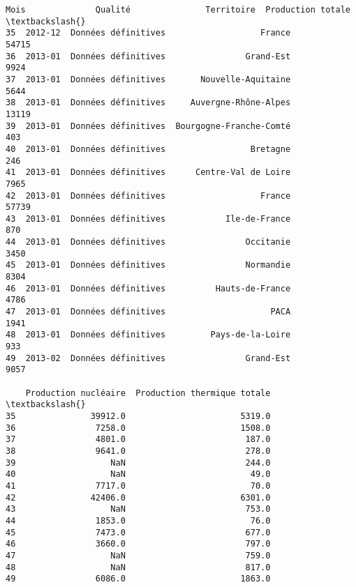 \documentclass[11pt]{article}
\makeatletter
\newcommand{\boxspacing}{\kern\kvtcb@left@rule\kern\kvtcb@boxsep}
\newcommand{\prompt}[4]{
        {\ttfamily\llap{{\color{#2}[#3]:\hspace{3pt}#4}}\vspace{-\baselineskip}}
    }
\makeatother
\begin{document}
            \begin{tcolorbox}[breakable, size=fbox, boxrule=.5pt, pad at break*=1mm, opacityfill=0]
\prompt{Out}{outcolor}{2}{\boxspacing}
\begin{Verbatim}[commandchars=\\\{\}]
       Mois              Qualité               Territoire  Production totale  \textbackslash{}
35  2012-12  Données définitives                   France              54715
36  2013-01  Données définitives                Grand-Est               9924
37  2013-01  Données définitives       Nouvelle-Aquitaine               5644
38  2013-01  Données définitives     Auvergne-Rhône-Alpes              13119
39  2013-01  Données définitives  Bourgogne-Franche-Comté                403
40  2013-01  Données définitives                 Bretagne                246
41  2013-01  Données définitives      Centre-Val de Loire               7965
42  2013-01  Données définitives                   France              57739
43  2013-01  Données définitives            Ile-de-France                870
44  2013-01  Données définitives                Occitanie               3450
45  2013-01  Données définitives                Normandie               8304
46  2013-01  Données définitives          Hauts-de-France               4786
47  2013-01  Données définitives                     PACA               1941
48  2013-01  Données définitives         Pays-de-la-Loire                933
49  2013-02  Données définitives                Grand-Est               9057

    Production nucléaire  Production thermique totale  \textbackslash{}
35               39912.0                       5319.0
36                7258.0                       1508.0
37                4801.0                        187.0
38                9641.0                        278.0
39                   NaN                        244.0
40                   NaN                         49.0
41                7717.0                         70.0
42               42406.0                       6301.0
43                   NaN                        753.0
44                1853.0                         76.0
45                7473.0                        677.0
46                3660.0                        797.0
47                   NaN                        759.0
48                   NaN                        817.0
49                6086.0                       1863.0


\end{Verbatim}
\end{tcolorbox}
\end{document}
